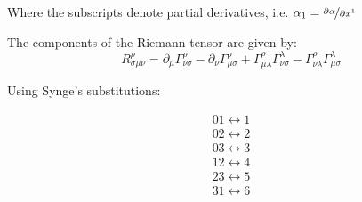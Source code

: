 \documentclass{article}
\begin{document}
Where the subscripts denote partial derivatives, i.e. $\alpha_{1}=\nicefrac{\partial\alpha}{\partial x^{1}}$

The components of the Riemann tensor are given by:
\begin{equation}
R_{\sigma\mu\nu}^{\rho}=\partial_{\mu}\Gamma_{\nu\sigma}^{\rho}-\partial_{\nu}\Gamma_{\mu\sigma}^{\rho}+\Gamma_{\mu\lambda}^{\rho}\Gamma_{\nu\sigma}^{\lambda}-\Gamma_{\nu\lambda}^{\rho}\Gamma_{\mu\sigma}^{\lambda}
\end{equation}

Using Synge's substitutions:
\begin{center}
\begin{equation}
\begin{array}{c}
01\longleftrightarrow1\\
02\longleftrightarrow2\\
03\longleftrightarrow3\\
12\longleftrightarrow4\\
23\longleftrightarrow5\\
31\longleftrightarrow6\\
\end{array}
\end{equation}
\end{center}
\end{document}
